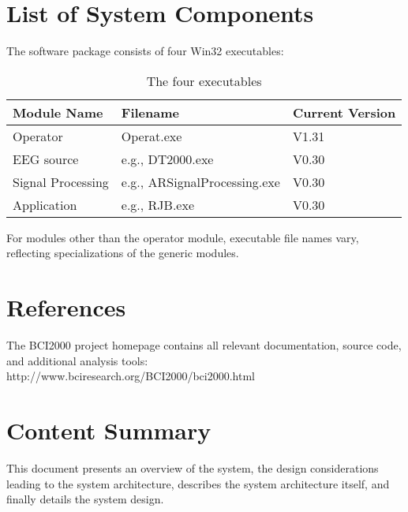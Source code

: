 \section{List of System Components}

The software package consists of four Win32 executables:

\begin{table}[ht]
 \centering
 \begin{tabular}{|l|l|l|}
  \hline
  \textbf{Module Name} & \textbf{Filename} & \textbf{Current Version} \\
  \hline
  Operator & Operat.exe & V1.31 \\
  \hline
  EEG source & e.g., DT2000.exe & V0.30 \\
  \hline
  Signal Processing & e.g., ARSignalProcessing.exe & V0.30 \\
  \hline
  Application & e.g., RJB.exe & V0.30 \\
  \hline
 \end{tabular}
 \caption{The four executables}
\end{table}   

For modules other than the operator module, executable file names vary, 
reflecting specializations of the generic modules.

\section{References}

The BCI2000 project homepage contains all relevant documentation, source code, 
and additional analysis tools:\\ 
http://www.bciresearch.org/BCI2000/bci2000.html

\section{Content Summary}

This document presents an overview of the system, the design considerations 
leading to the system architecture, describes the system architecture itself, 
and finally details the system design.
